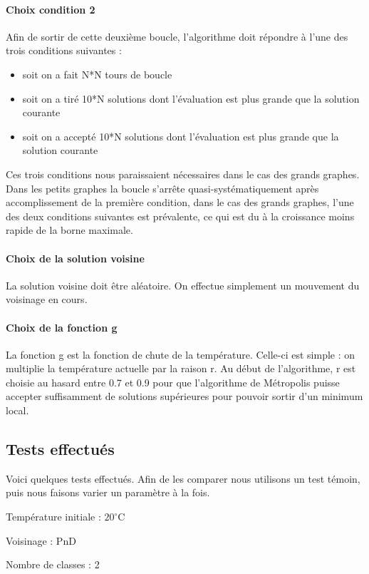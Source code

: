 \documentclass[12pt]{article}
\begin{document}
\paragraph{Choix condition 2} Afin de sortir de cette deuxième boucle, l’algorithme doit répondre à l’une des trois conditions suivantes :
	\begin{itemize}
	\item soit on a fait N*N tours de boucle
	\item soit on a tiré 10*N solutions dont l’évaluation est plus grande que la solution courante
	\item soit on a accepté 10*N solutions dont l’évaluation est plus grande que la solution courante
	\end{itemize}
Ces trois conditions nous paraissaient nécessaires dans le cas des grands graphes. Dans les petits graphes la boucle s'arrête quasi-systématiquement après accomplissement de la première condition, dans le cas des grands graphes, l’une des deux conditions suivantes est prévalente, ce qui est du à la croissance moins rapide de la borne maximale.


\paragraph{Choix de la solution voisine} La solution voisine doit être aléatoire. On effectue simplement un mouvement du voisinage en cours.
\paragraph{Choix de la fonction g} La fonction g est la fonction de chute de la température. Celle-ci est simple : on multiplie la température actuelle par la raison r. Au début de l’algorithme, r est choisie au hasard entre 0.7 et 0.9 pour que l’algorithme de Métropolis puisse accepter suffisamment de solutions supérieures pour pouvoir sortir d’un minimum local. 

\subsection{Tests effectués}
Voici quelques tests effectués. Afin de les comparer nous utilisons un test témoin, puis nous faisons varier un paramètre à la fois.

\bigskip
Température initiale : $20^\circ$C

Voisinage : PnD

Nombre de classes : 2
\bigskip
\end{document}

